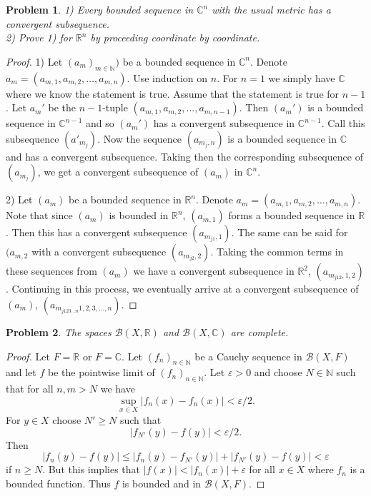 \documentclass{article}
\newtheorem{problem}{Problem}
\begin{document}
\begin{flushleft}
\begin{problem}
1) Every bounded sequence in $\mathbb{C}^n$ with the usual metric has a convergent subsequence.\\
2) Prove 1) for $\mathbb{R}^n$ by proceeding coordinate by coordinate.
\end{problem}
\begin{proof}
1) Let $(a_m)_{m \in \mathbb{N}})$ be a bounded sequence in $\mathbb{C}^n$. Denote $a_m = (a_{m,1}, a_{m,2}, \dots , a_{m,n})$. Use induction on $n$. For $n=1$ we simply have $\mathbb{C}$ where we know the statement is true. Assume that the statement is true for $n-1$. Let $a_m'$ be the $n-1$-tuple $(a_{m,1}, a_{m,2}, \dots , a_{m,n-1})$. Then $(a_m')$ is a bounded sequence in $\mathbb{C}^{n-1}$ and so $(a_m')$ has a convergent subsequence in $\mathbb{C}^{n-1}$. Call this subsequence $(a'_{m_j})$. Now the sequence $(a_{m_j,n})$ is a bounded sequence in $\mathbb{C}$ and has a convergent subsequence. Taking then the corresponding subsequence of $(a_{m_j})$, we get a convergent subsequence of $(a_m)$ in $\mathbb{C}^n$.\newline

2) Let $(a_m)$ be a bounded sequence in $\mathbb{R}^n$. Denote $a_m = (a_{m,1}, a_{m,2}, \dots , a_{m,n})$. Note that since $(a_m)$ is bounded in $\mathbb{R}^n$, $(a_{m,1})$ forms a bounded sequence in $\mathbb{R}$. Then this has a convergent subsequence $(a_{m_{j1},1})$. The same can be said for $(a_{m,2}$ with a convergent subsequence $(a_{m_{j2},2})$. Taking the common terms in these sequences from $(a_m)$ we have a convergent subsequence in $\mathbb{R}^2$, $(a_{m_{j12},1,2})$. Continuing in this process, we eventually arrive at a convergent subsequence of $(a_m)$, $(a_{m_{j123\dots n}1,2,3, \dots , n})$.
\end{proof}

\begin{problem}
The spaces $\mathcal{B} (X, \mathbb{R})$ and $\mathcal{B} (X, \mathbb{C})$ are complete.
\end{problem}
\begin{proof}
Let $F = \mathbb{R}$ or $F = \mathbb{C}$. Let $(f_n)_{n \in \mathbb{N}}$ be a Cauchy sequence in $\mathcal{B} (X, F)$ and let $f$ be the pointwise limit of $(f_n)_{n \in \mathbb{N}}$. Let $\varepsilon > 0$ and choose $N \in \mathbb{N}$ such that for all $n,m > N$ we have
\[
\sup_{x \in X} |f_n(x) - f_n(x)| < \varepsilon/2.
\]
For $y \in X$ choose $N' \geq N$ such that
\[
|f_{N'}(y) - f(y)| < \varepsilon/2.
\]
Then
\[
|f_n(y) - f(y)| \leq |f_n(y) - f_{N'}(y)| + |f_{N'}(y) - f(y)| < \varepsilon
\]
if $n \geq N$. But this implies that $|f(x)| < |f_n(x)| + \varepsilon$ for all $x \in X$ where $f_n$ is a bounded function. Thus $f$ is bounded and in $\mathcal{B} (X, F)$.
\end{proof}


\end{flushleft}
\end{document}

